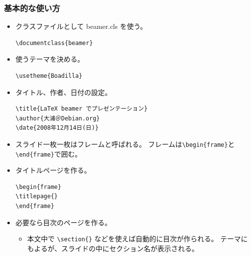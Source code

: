 \documentclass[mingoth,a4paper]{jsarticle}
\begin{document}
\subsubsection{基本的な使い方}

\begin{itemize}
\item クラスファイルとして beamer.cls を使う。
  \begin{screen}
\begin{verbatim}
\documentclass{beamer}
\end{verbatim}
  \end{screen}
\item 使うテーマを決める。
  \begin{screen}
\begin{verbatim}
\usetheme{Boadilla}
\end{verbatim}
  \end{screen}
\item タイトル、作者、日付の設定。
  \begin{screen}
\begin{verbatim}
\title{LaTeX beamer でプレゼンテーション}
\author{大浦＠Debian.org}
\date{2008年12月14日(日)}
\end{verbatim}
  \end{screen}
\item スライド一枚一枚はフレームと呼ばれる。
  フレームは\verb|\begin{frame}|と\verb|\end{frame}|で囲む。
\item タイトルページを作る。
  \begin{screen}
\begin{verbatim}
\begin{frame}
\titlepage{}
\end{frame}
\end{verbatim}
  \end{screen}
\item 必要なら目次のページを作る。
  \begin{itemize}
  \item 本文中で \verb|\section{}| などを使えば自動的に目次が作られる。
    テーマにもよるが、スライドの中にセクション名が表示される。
  \end{itemize}
  \begin{screen}
\begin{verbatim}

\end{verbatim}
\end{screen}
\end{itemize}
\end{document}
